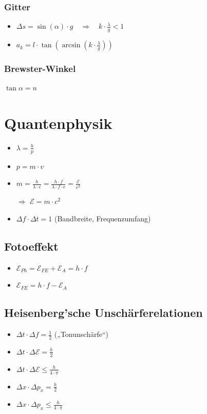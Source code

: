\documentclass[paper = a4, twocolumn]{scrartcl}
\DeclareRobustCommand{\E}{\mathcal{E}}
\begin{document}
\subsubsection{Gitter}
\begin{itemize}
\item
	\( \Delta s = \sin(\alpha) \cdot g \quad \Rightarrow \quad k \cdot
	\frac{\lambda}{g} < 1 \)
\item
	\( a_k = l \cdot \tan(\arcsin(k \cdot \frac{\lambda}{g})) \)
\end{itemize}

\subsubsection{Brewster-Winkel}
\( \tan \alpha = n \)

\section{Quantenphysik}
\begin{itemize}
\item
	\( \lambda = \frac{h}{p} \)
\item
	\( p = m \cdot v \)
\item
	\( m = \frac{h}{\lambda \cdot c} = \frac{h \cdot f}{\lambda \cdot f \cdot c}
	= \frac{\E}{c^2} \)
\item[\(\Rightarrow\)]
	\( \E = m \cdot c^2 \)
\item
	\(\Delta f \cdot \Delta t = 1\) (Bandbreite, Frequenzumfang)

\end{itemize}

\subsection{Fotoeffekt}
\begin{itemize}
\item
	\( \E_{Ph} = \E_{FE} + \E_A = h \cdot f \)
\item
	\( \E_{FE} = h \cdot f - \E_A \)

\end{itemize}

\subsection{Heisenberg’sche Unschärferelationen}
\begin{itemize}
\item
	\( \Delta t \cdot \Delta f = \frac{1}{2} \) („Tonunschärfe“)
\item
	\( \Delta t \cdot \Delta \E = \frac{h}{2} \)
\item
	\( \Delta t \cdot \Delta \E \le \frac{h}{4 \cdot \pi} \)
\item
	\( \Delta x \cdot \Delta p_x = \frac{h}{2} \)
\item
	\( \Delta x \cdot \Delta p_x \le \frac{h}{4 \cdot \pi} \)
\end{itemize}
\end{document}

